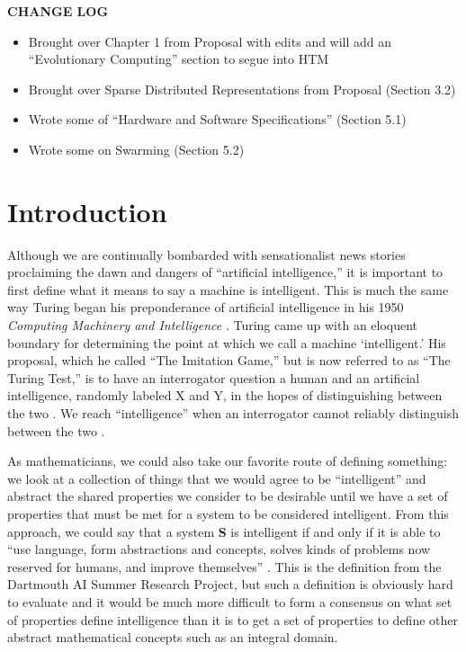 \documentclass[oneside,12pt,openany]{book}
\begin{document}
	\listoffigures
	\vfill
	\pagebreak
	
	\listoftables
	\vfill
	\pagebreak
	
	
	\begin{center}
		\textbf{\LARGE CHANGE LOG}
	\end{center}
	\begin{itemize}
		\item Brought over Chapter 1 from Proposal with edits and will add an ``Evolutionary Computing'' section to segue into HTM
		\item Brought over Sparse Distributed Representations from Proposal (Section 3.2) 
		\item Wrote some of ``Hardware and Software Specifications'' (Section 5.1)
		\item Wrote some on Swarming (Section 5.2)
	\end{itemize}
	
	
	\vfill
	\pagebreak
	
	\mainmatter
	\chapter{Introduction}
	
	Although we are continually bombarded with sensationalist news stories proclaiming the dawn and dangers of ``artificial intelligence,'' it is important to first define what it means to say a machine is intelligent. This is much the same way Turing began his preponderance of artificial intelligence in his 1950 \textit{Computing Machinery and Intelligence} \cite{Turing}. Turing came up with an eloquent boundary for determining the point at which we call a machine `intelligent.' His proposal, which he called ``The Imitation Game,'' but is now referred to as ``The Turing Test,'' is to have an interrogator question a human and an artificial intelligence, randomly labeled X and Y, in the hopes of distinguishing between the two \cite{Turing}. We reach ``intelligence'' when an interrogator cannot reliably distinguish between the two \cite{Turing}.
	
	As mathematicians, we could also take our favorite route of defining something: we look at a collection of things that we would agree to be ``intelligent'' and abstract the shared properties we consider to be desirable until we have a set of properties that must be met for a system to be considered intelligent. From this approach, we could say that a system \textbf{S} is intelligent if and only if it is able to ``use language, form abstractions and concepts, solves kinds of problems now reserved for humans, and improve themselves'' \cite{Jones}. This is the definition from the Dartmouth AI Summer Research Project, but such a definition is obviously hard to evaluate and it would be much more difficult to form a consensus on what set of properties define intelligence than it is to get a set of properties to define other abstract mathematical concepts such as an integral domain.
	
\end{document}

